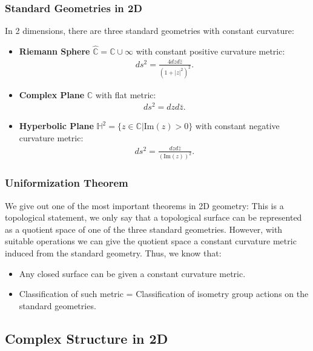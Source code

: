 \subsubsection{Standard Geometries in 2D}

In 2 dimensions, there are three standard geometries with constant curvature:
\begin{itemize}
  \item \textbf{Riemann Sphere} $ \hat{\mathbb{C}} = \mathbb{C}\cup \infty $ with constant positive curvature metric:
    \begin{align}
      ds^2=\frac{4dzd\bar{z}}{(1+|z|^2)^2}.
    \end{align}
  \item \textbf{Complex Plane} $ \mathbb{C} $ with flat metric:
    \begin{align}
      ds^2=dzd\bar{z}.
    \end{align}
  \item \textbf{Hyperbolic Plane} $ \mathbb{H}^2 = \{z\in\mathbb{C}|\text{Im}(z)>0\} $ with constant negative curvature metric:
    \begin{align}
      ds^2=\frac{dzd\bar{z}}{(\text{Im}(z))^2}.
    \end{align}
\end{itemize}

\subsubsection{Uniformization Theorem}

We give out one of the most important theorems in 2D geometry:
This is a topological statement, we only say that a topological surface can be represented as a quotient space of one of the three standard geometries. However, with suitable operations we can give the quotient space a constant curvature metric induced from the standard geometry. Thus, we know that:
\begin{itemize}
  \item Any closed surface can be given a constant curvature metric.
    \item Classification of such metric = Classification of isometry group actions on the standard geometries.
\end{itemize}


\subsection{Complex Structure in 2D}



